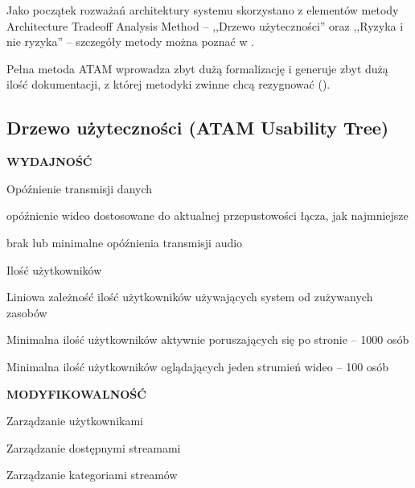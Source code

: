 Jako początek rozważań architektury systemu skorzystano z elementów metody Architecture Tradeoff Analysis Method -- ,,Drzewo użyteczności'' oraz ,,Ryzyka i nie ryzyka'' -- szczegóły metody można poznać w \cite{Kaz2000}.

Pełna metoda ATAM wprowadza zbyt dużą formalizację i generuje zbyt dużą ilość dokumentacji, z której metodyki zwinne chcą rezygnować ().

\subsection{Drzewo użyteczności (ATAM Usability Tree)}
\label{sec:EtapIdrzewoUzytecznosci}

\begin{packed_item}
    \item{
        \textbf{WYDAJNOŚĆ}
        \begin{packed_item}
            \item{
                Opóźnienie transmisji danych
                \begin{packed_item}
                    \item{opóźnienie wideo dostosowane do aktualnej przepustowości łącza, jak najmniejsze}
                    \item{brak lub minimalne opóźnienia transmisji audio}
                \end{packed_item}
            }
            \item{
                Ilość użytkowników
                \begin{packed_item}
                    \item{Liniowa zależność ilość użytkowników używających system od zużywanych zasobów}
                    \item{Minimalna ilość użytkowników aktywnie poruszających się po stronie -- 1000 osób}
                    \item{Minimalna ilość użytkowników oglądających jeden strumień wideo -- 100 osób}
                \end{packed_item}
            }
        \end{packed_item}
    }
    \item{
        \textbf{MODYFIKOWALNOŚĆ}
        \begin{packed_item}
            \item{Zarządzanie użytkownikami}
            \item{Zarządzanie dostępnymi streamami}
            \item{Zarządzanie kategoriami streamów}

\end{packed_item}}
\end{packed_item}
